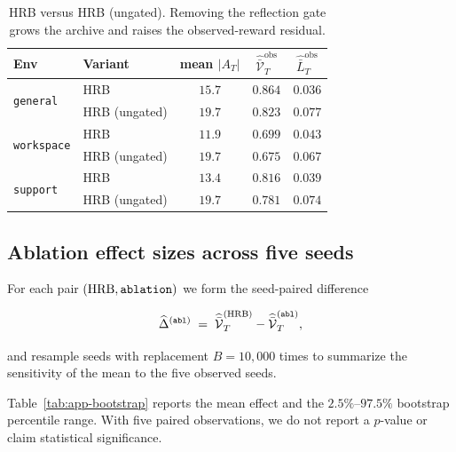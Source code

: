 \documentclass{article} %
\begin{document}
\begin{table}[h]
\centering
\small
\caption{HRB versus HRB (ungated). Removing the reflection gate grows the archive
and raises the observed-reward residual.}
\label{tab:app-ungated}
\begin{tabular}{llccc}
\toprule
Env & Variant & mean $|A_T|$ & $\widehat{\bar{\mathcal V}}_T^{\mathrm{obs}}$ & $\widehat{\bar L}_T^{\mathrm{obs}}$ \\
\midrule
\multirow{2}{*}{\texttt{general}}
 & HRB           & $15.7$ & $0.864$ & $0.036$ \\
 & HRB (ungated) & $19.7$ & $0.823$ & $0.077$ \\
\midrule
\multirow{2}{*}{\texttt{workspace}}
 & HRB           & $11.9$ & $0.699$ & $0.043$ \\
 & HRB (ungated) & $19.7$ & $0.675$ & $0.067$ \\
\midrule
\multirow{2}{*}{\texttt{support}}
 & HRB           & $13.4$ & $0.816$ & $0.039$ \\
 & HRB (ungated) & $19.7$ & $0.781$ & $0.074$ \\
\bottomrule
\end{tabular}

\end{table}

\subsection{Ablation effect sizes across five seeds}

\label{app:tab-bootstrap}

For each pair $(\textnormal{HRB},\texttt{ablation})$ we form the seed-paired difference

\begin{equation}
\label{eq:app-tab-effect}
\widehat\Delta^{(\texttt{abl})} \;=\; \widehat{\bar{\mathcal V}}_T^{(\textnormal{HRB})} - \widehat{\bar{\mathcal V}}_T^{(\texttt{abl})},
\end{equation}

and resample seeds with replacement \(B=10{,}000\) times to summarize the
sensitivity of the mean to the five observed seeds.

Table~\ref{tab:app-bootstrap} reports the mean effect and the \(2.5\%\)--\(97.5\%\)
bootstrap percentile range. With five paired observations, we do not report a
\(p\)-value or claim statistical significance.
\end{document}
